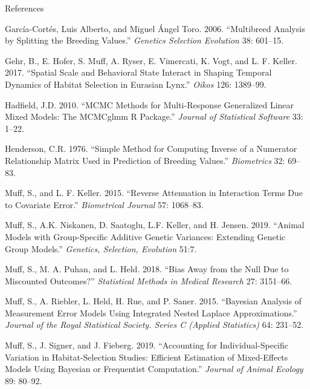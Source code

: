 \documentclass[10pt,ignorenonframetext,]{beamer}
\begin{document}
\begin{frame}{References}
\protect\hypertarget{references}{}

\tiny

\hypertarget{refs}{}
\leavevmode\hypertarget{ref-garcia-cortes.etal2006}{}%
García-Cortés, Luis Alberto, and Miguel Ángel Toro. 2006. ``Multibreed
Analysis by Splitting the Breeding Values.'' \emph{Genetics Selection
Evolution} 38: 601--15.

\leavevmode\hypertarget{ref-gehr.etal2016}{}%
Gehr, B., E. Hofer, S. Muff, A. Ryser, E. Vimercati, K. Vogt, and L. F.
Keller. 2017. ``Spatial Scale and Behavioral State Interact in Shaping
Temporal Dynamics of Habitat Selection in Eurasian Lynx.'' \emph{Oikos}
126: 1389--99.

\leavevmode\hypertarget{ref-hadfield2010}{}%
Hadfield, J.D. 2010. ``MCMC Methods for Multi-Response Generalized
Linear Mixed Models: The MCMCglmm R Package.'' \emph{Journal of
Statistical Software} 33: 1--22.

\leavevmode\hypertarget{ref-henderson1976}{}%
Henderson, C.R. 1976. ``Simple Method for Computing Inverse of a
Numerator Relationship Matrix Used in Prediction of Breeding Values.''
\emph{Biometrics} 32: 69--83.

\leavevmode\hypertarget{ref-muff.keller2015}{}%
Muff, S., and L. F. Keller. 2015. ``Reverse Attenuation in Interaction
Terms Due to Covariate Error.'' \emph{Biometrical Journal} 57: 1068--83.

\leavevmode\hypertarget{ref-muff.etal2019}{}%
Muff, S., A.K. Niskanen, D. Saatoglu, L.F. Keller, and H. Jensen. 2019.
``Animal Models with Group-Specific Additive Genetic Variances:
Extending Genetic Group Models.'' \emph{Genetics, Selection, Evolution}
51:7.

\leavevmode\hypertarget{ref-muff.etal2018}{}%
Muff, S., M. A. Puhan, and L. Held. 2018. ``Bias Away from the Null Due
to Miscounted Outcomes?'' \emph{Statistical Methods in Medical Research}
27: 3151--66.

\leavevmode\hypertarget{ref-muff.etal2015}{}%
Muff, S., A. Riebler, L. Held, H. Rue, and P. Saner. 2015. ``Bayesian
Analysis of Measurement Error Models Using Integrated Nested Laplace
Approximations.'' \emph{Journal of the Royal Statistical Society. Series
C (Applied Statistics)} 64: 231--52.

\leavevmode\hypertarget{ref-muff.etal2019b}{}%
Muff, S., J. Signer, and J. Fieberg. 2019. ``Accounting for
Individual-Specific Variation in Habitat-Selection Studies: Efficient
Estimation of Mixed-Effects Models Using Bayesian or Frequentist
Computation.'' \emph{Journal of Animal Ecology} 89: 80--92.


\end{frame}
\end{document}
